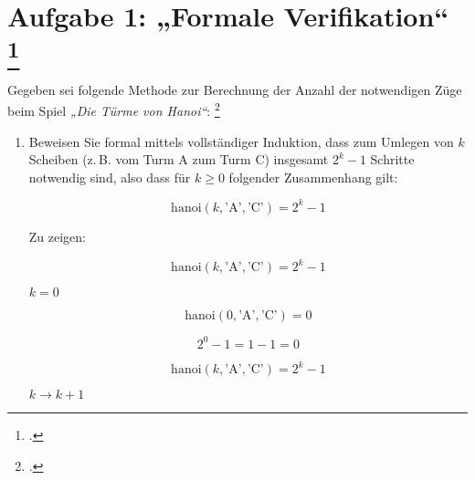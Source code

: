 \documentclass{lehramt-informatik-aufgabe}
\begin{document}

\section{Aufgabe 1: „Formale Verifikation“
\footcite[Thema 2 Teilaufgabe 1 Aufgabe 1]{examen:46116:2014:03}}

Gegeben sei folgende Methode zur Berechnung der Anzahl der notwendigen
Züge beim Spiel \emph{„Die Türme von Hanoi“}:
\footcite{sosy:pu:5:1}


\begin{enumerate}


\item Beweisen Sie formal mittels vollständiger Induktion, dass zum
Umlegen von $k$ Scheiben (z.\,B. vom Turm A zum Turm C) insgesamt
$2^k-1$ Schritte notwendig sind, also dass für $k \geq 0$ folgender
Zusammenhang gilt:

\begin{displaymath}
\text{hanoi}(k,\text{'A'},\text{'C'}) = 2^k - 1
\end{displaymath}

\begin{antwort}
Zu zeigen:

\begin{displaymath}
\text{hanoi}(k,\text{'A'},\text{'C'}) = 2^k - 1
\end{displaymath}

%

 $k=0$

\begin{displaymath}
\text{hanoi}(0,\text{'A'},\text{'C'}) = 0
\end{displaymath}

\begin{displaymath}
2^0 - 1 = 1 - 1 = 0
\end{displaymath}

%


\begin{displaymath}
\text{hanoi}(k,\text{'A'},\text{'C'}) = 2^k - 1
\end{displaymath}

%

 $k \rightarrow k + 1$


\end{antwort}
\end{enumerate}
\end{document}
